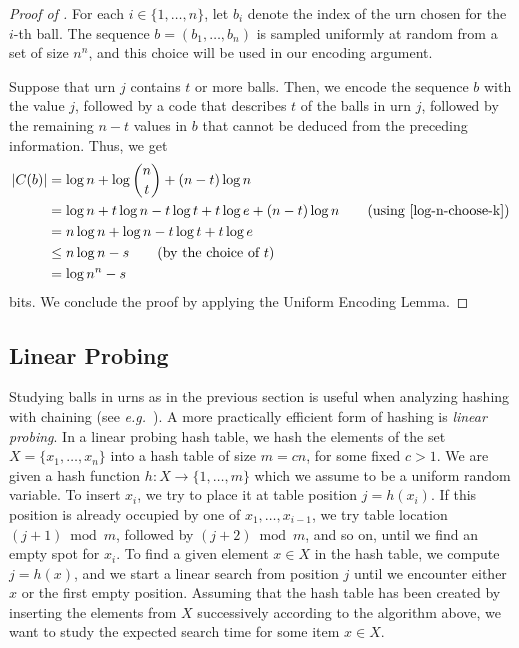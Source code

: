 \documentclass{patmorin}
\begin{document}
\begin{proof}[Proof of ]
  For each $i\in\{1,\ldots,n\}$, let $b_i$ denote the index of the urn
  chosen for the $i$-th ball. The sequence $b = (b_1,\ldots,b_n)$ is
  sampled uniformly at random from a set of size $n^n$, and this
  choice will be used in our encoding argument.

  Suppose that urn $j$ contains $t$ or more balls. Then,
  we encode the sequence $b$
  with the value $j$, followed by a code that describes $t$ of
  the balls in urn $j$, followed by the remaining $n-t$ values in
  $b$ that cannot be deduced from the preceding
  information.  Thus, we get
  \begin{align*}
    |C(b)| &= \log n + \log\binom{n}{t} + (n-t)\log n \\
           &= \log n + t\log n - t\log t + t\log e + (n-t)\log n
             \tag{using \eqref{log-n-choose-k}} \\
           & = n \log n + \log n - t\log t + t\log e \\
           & \le n \log n - s \tag{by the choice of $t$} \\
           & = \log n^n - s
  \end{align*}
  bits. We conclude the proof by applying the Uniform Encoding Lemma.
\end{proof}

\subsection{Linear Probing}

Studying balls in urns as in the previous section is useful when 
analyzing hashing with chaining
(see \emph{e.g.}~\cite[Section~5.1]{morin:open}). A more practically
efficient form of hashing is \emph{linear probing}.  In a linear
probing hash table, we hash the elements of the set
$X = \{x_1, \ldots, x_n\}$ into a hash table of size $m=cn$, for some
fixed $c> 1$. We are given a hash function
$h : X \to \{1, \ldots, m\}$ which we assume to be a uniform random
variable. To insert $x_i$, we try to place it at table position
$j=h(x_i)$. If this position is already occupied by one of
$x_1,\ldots,x_{i-1}$, we try table location
$(j+1)\bmod m$, followed by $(j+2)\bmod m$, and so on, until 
we find an empty spot
for $x_i$.  
To find a given element $x \in X$ in the hash table, we compute
$j = h(x)$, and we start a linear search from position $j$ 
until we encounter either $x$ or the first empty position.
Assuming that the hash table has been created by inserting
the elements from $X$ successively according to the
algorithm above, 
we want to study the expected search time for some item
$x \in X$.
\end{document}
